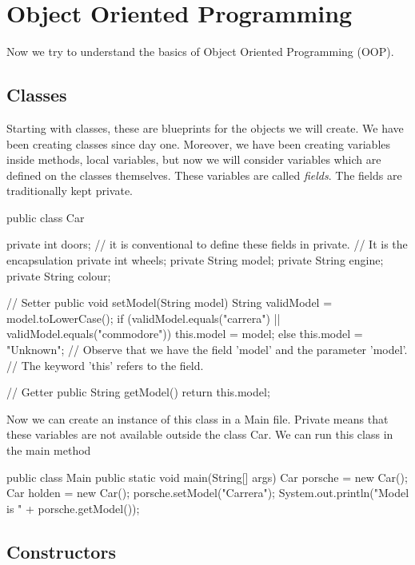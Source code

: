 \section{Object Oriented Programming}

Now we try to understand the basics of Object Oriented Programming (OOP).

\subsection{Classes} 

Starting with classes, these are blueprints for the objects we will create. We have been creating 
classes since day one. Moreover, we have been creating variables inside methods, local variables, 
but now we will consider variables which are defined on the classes themselves. These variables 
are called \emph{fields}. The fields are traditionally kept private. 
\begin{listing}{1}
public class Car {

    private int doors; 
    // it is conventional to define these fields in private. 
    // It is the encapsulation
    private int wheels; 
    private String model; 
    private String engine; 
    private String colour; 

    // Setter
    public void setModel(String model) {
        String validModel = model.toLowerCase();
        if (validModel.equals("carrera") || validModel.equals("commodore")) {
                this.model = model; 
        } else {
                this.model = "Unknown"; 
        }
        // Observe that we have the field 'model' and the parameter 'model'. 
        // The keyword 'this' refers to the field.  
    }

    // Getter
    public String getModel() {
        return this.model;
    }
}
\end{listing}
Now we can create an instance of this class in a Main file. Private means that these variables
are not available outside the class Car. We can run this class in the main method 
\begin{listing}{1}
public class Main {
    public static void main(String[] args) {
        Car porsche = new Car();
        Car holden = new Car();
        porsche.setModel("Carrera");
        System.out.println("Model is " + porsche.getModel());
    }
}
\end{listing}

\subsection{Constructors}


